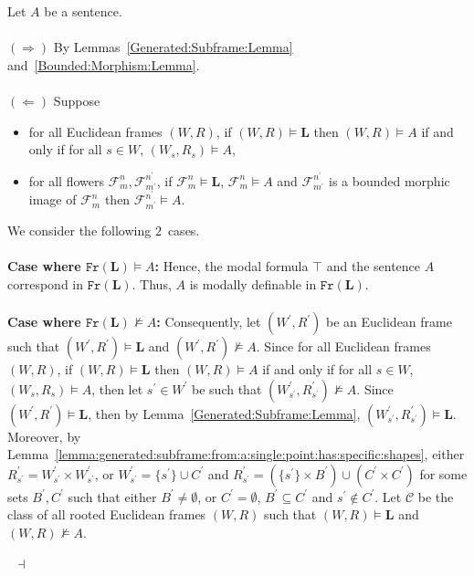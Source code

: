 \documentclass[draft]{article}
\newenvironment{proof}{{\bf Proof:}}{~$\dashv$\\}
\def\Fr{\mathtt{Fr}}
\def\L{\mathbf{L}}
\begin{document}
%
%
\begin{proof}
%
%
Let $A$ be a sentence.
%
%
\\
\\
%
%
$(\Rightarrow)$
By Lemmas~\ref{Generated:Subframe:Lemma} and~\ref{Bounded:Morphism:Lemma}.
%
%
\\
\\
%
%
$(\Leftarrow)$
Suppose
%
%
\begin{itemize}
%
%
\item for all Euclidean frames $(W,R)$, if $(W,R){\models}\L$ then $(W,R){\models}A$ if and only if for all $s{\in}W$, $(W_{s},R_{s}){\models}A$,
%
%
\item for all flowers ${\mathcal F}_{m}^{n},{\mathcal F}_{m^{\prime}}^{n^{\prime}}$, if ${\mathcal F}_{m}^{n}{\models}\L$, ${\mathcal F}_{m}^{n}{\models}A$ and ${\mathcal F}_{m^{\prime}}^{n^{\prime}}$ is a bounded morphic image of ${\mathcal F}_{m}^{n}$ then ${\mathcal F}_{m^{\prime}}^{n^{\prime}}{\models}A$.
%
%
\end{itemize}
%
%
We consider the following $2$~cases.
%
%
\\
\\
%
%
{\bf Case where $\Fr(\L){\models}A$:}
Hence, the modal formula $\top$ and the sentence $A$ correspond in $\Fr(\L)$.
Thus, $A$ is modally definable in $\Fr(\L)$.
%
%
\\
\\
%
%
{\bf Case where $\Fr(\L){\not\models}A$:}
Consequently, let $(W^{\prime},R^{\prime})$ be an Euclidean frame such that $(W^{\prime},R^{\prime}){\models}\L$ and $(W^{\prime},R^{\prime}){\not\models}A$.
Since for all Euclidean frames $(W,R)$, if $(W,R){\models}\L$ then $(W,R){\models}A$ if and only if for all $s{\in}W$, $(W_{s},R_{s}){\models}A$, then let $s^{\prime}{\in}W^{\prime}$ be such that $(W^{\prime}_{s^{\prime}},R^{\prime}_{s^{\prime}}){\not\models}A$.
Since $(W^{\prime},R^{\prime}){\models}\L$, then by Lemma~\ref{Generated:Subframe:Lemma}, $(W^{\prime}_{s^{\prime}},R^{\prime}_{s^{\prime}}){\models}\L$.
Moreover, by Lemma~\ref{lemma:generated:subframe:from:a:single:point:has:specific:shapes}, either $R^{\prime}_{s^{\prime}}{=}W^{\prime}_{s^{\prime}}{\times}W^{\prime}_{s^{\prime}}$, or $W^{\prime}_{s^{\prime}}{=}\{s^{\prime}\}{\cup}C^{\prime}$ and $R^{\prime}_{s^{\prime}}{=}(\{s^{\prime}\}{\times}B^{\prime}){\cup}(C^{\prime}{\times}C^{\prime})$ for some sets $B^{\prime},C^{\prime}$ such that either $B^{\prime}{\not=}\emptyset$, or $C^{\prime}{=}\emptyset$, $B^{\prime}{\subseteq}C^{\prime}$ and $s^{\prime}{\not\in}C^{\prime}$.
Let ${\mathcal C}$ be the class of all rooted Euclidean frames $(W,R)$ such that $(W,R){\models}\L$ and $(W,R){\not\models}A$.

\end{proof}
\end{document}

